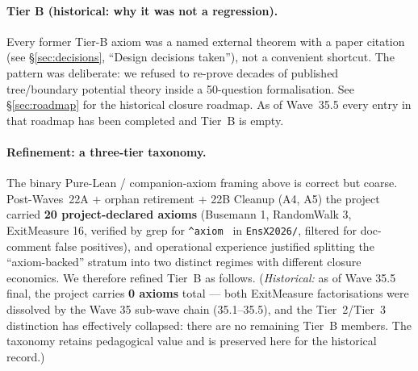 \documentclass[11pt,a4paper]{article}
\newcommand{\cmd}[1]{\texttt{\small #1}}
\theoremstyle{plain}
\theoremstyle{definition}
\begin{document}
\paragraph{Tier B (historical: why it was not a regression).}
Every former Tier-B axiom was a named external theorem with a paper
citation (see \S\ref{sec:decisions}, ``Design decisions taken''),
not a convenient shortcut. The pattern was deliberate: we refused
to re-prove decades of published tree/boundary potential theory
inside a 50-question formalisation. See \S\ref{sec:roadmap} for
the historical closure roadmap. As of Wave~35.5 every entry in
that roadmap has been completed and Tier~B is empty.

\paragraph{Refinement: a three-tier taxonomy.}
The binary Pure-Lean / companion-axiom framing above is correct but
coarse. Post-Waves~22A + orphan retirement + 22B Cleanup (A4, A5)
the project carried \textbf{20 project-declared axioms} (Busemann 1,
RandomWalk 3, ExitMeasure 16, verified by grep for \verb|^axiom |
in \cmd{EnsX2026/}, filtered for doc-comment false positives), and
operational experience justified splitting the ``axiom-backed''
stratum into two distinct regimes with different closure economics.
We therefore refined Tier~B as follows. (\emph{Historical:} as of
Wave 35.5 final, the project carries \textbf{0 axioms}
total --- both ExitMeasure factorisations were dissolved by the
Wave 35 sub-wave chain (35.1--35.5), and the
Tier~2/Tier~3 distinction has effectively collapsed: there are no
remaining Tier~B members. The taxonomy retains pedagogical value
and is preserved here for the historical record.)
\end{document}
